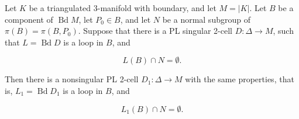 Let $K$ be a triangulated 3-manifold with boundary, and let $M = |K|$. Let $B$ be a component of $\operatorname{Bd} M$, let $P_0 \in B$, and let $N$ be a normal subgroup of $\pi(B) = \pi(B, P_0)$. Suppose that there is a PL singular 2-cell $D: \Delta \rightarrow M$, such that $L = \operatorname{Bd} D$ is a loop in $B$, and

$$L(B) \cap N = \emptyset.$$

Then there is a nonsingular PL 2-cell $D_1: \Delta \rightarrow M$ with the same properties, that is, $L_1 = \operatorname{Bd} D_1$ is a loop in $B$, and

$$L_1(B) \cap N = \emptyset.$$
